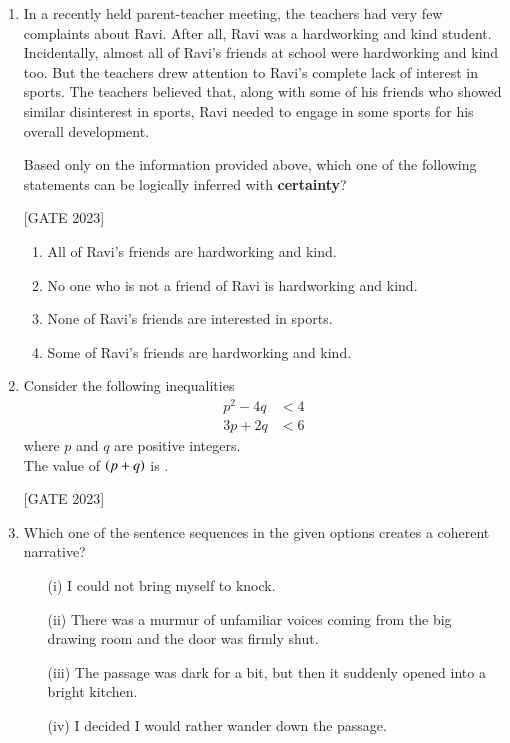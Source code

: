 \documentclass[journal,12pt,onecolumn]{IEEEtran}
\theoremstyle{remark}
\begin{document}
\begin{enumerate}
\item In a recently held parent-teacher meeting, the teachers had very few complaints about Ravi. After all, Ravi was a hardworking and kind student. Incidentally, almost all of Ravi's friends at school were hardworking and kind too. But the teachers drew attention to Ravi's complete lack of interest in sports. The teachers believed that, along with some of his friends who showed similar disinterest in sports, Ravi needed to engage in some sports for his overall development.

Based only on the information provided above, which one of the following statements can be logically inferred with \textbf{certainty}?

\hfill{[GATE 2023]}\begin{enumerate}
    \item All of Ravi's friends are hardworking and kind.
    \item No one who is not a friend of Ravi is hardworking and kind.
    \item None of Ravi's friends are interested in sports.
    \item Some of Ravi's friends are hardworking and kind.
\end{enumerate}
 \item Consider the following inequalities
\begin{align*}
    p^2 - 4q &< 4 \\
    3p + 2q &< 6
\end{align*}
where $ p $ and $ q $ are positive integers.\\
The value of $ \left(p + q\right) $ is \underline{\hspace{2cm}}.

\vspace{1em}

\hfill{[GATE 2023]}\begin{enumerate}
\end{enumerate}
\item Which one of the sentence sequences in the given options creates a coherent narrative?

\begin{enumerate}
    \item[(i)] I could not bring myself to knock.
    \item[(ii)] There was a murmur of unfamiliar voices coming from the big drawing room and the door was firmly shut.
    \item[(iii)] The passage was dark for a bit, but then it suddenly opened into a bright kitchen.
    \item[(iv)] I decided I would rather wander down the passage.
\end{enumerate}


\end{enumerate}
\end{document}
